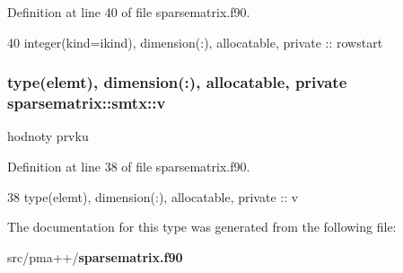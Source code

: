 Definition at line 40 of file sparsematrix.\+f90.


\begin{DoxyCode}
40         \textcolor{keywordtype}{integer(kind=ikind)}, \textcolor{keywordtype}{dimension(:)}, \textcolor{keywordtype}{allocatable}, \textcolor{keywordtype}{private} :: rowstart
\end{DoxyCode}
\subsubsection[{v}]{\setlength{\rightskip}{0pt plus 5cm}type({\bf elemt}), dimension(\+:), allocatable, private sparsematrix\+::smtx\+::v\hspace{0.3cm}{\ttfamily [private]}}\label{structsparsematrix_1_1smtx_abe25e59c1c4246f59e56d2fa4b8dd501}


hodnoty prvku 



Definition at line 38 of file sparsematrix.\+f90.


\begin{DoxyCode}
38         \textcolor{keywordtype}{type}(elemt), \textcolor{keywordtype}{dimension(:)}, \textcolor{keywordtype}{allocatable}, \textcolor{keywordtype}{private} :: v
\end{DoxyCode}


The documentation for this type was generated from the following file\+:\begin{DoxyCompactItemize}
\item 
src/pma++/{\bf sparsematrix.\+f90}\end{DoxyCompactItemize}
